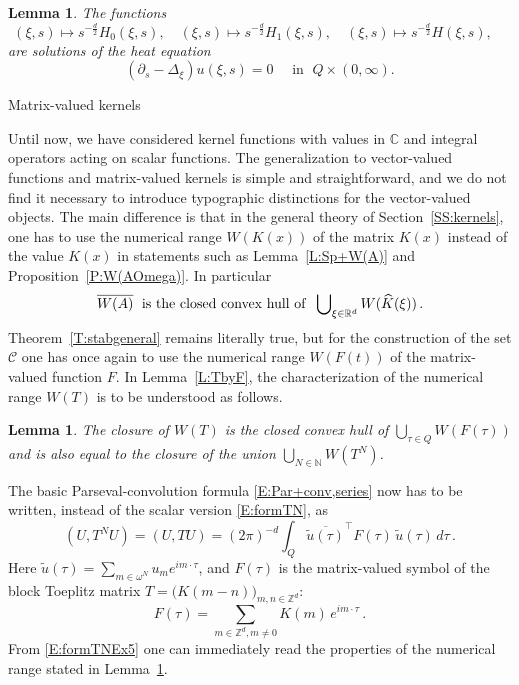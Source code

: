 \documentclass[12pt]{amsart}
\makeatletter
\def\subsection{\@startsection{section}{1}%
  \z@{1.2\linespacing\@plus\linespacing}{.5\linespacing}%
  {\normalfont\scshape\centering}}
\def\subsection{\@startsection{subsection}{2}%
  \z@{0.9\linespacing\@plus.7\linespacing}{-.5em}%
  {\normalfont\bfseries}}
\newtheorem{lemma}[theorem]{Lemma}
\theoremstyle{definition}
\theoremstyle{remark}
\numberwithin{equation}{section}
\newcommand\C{{\mathbb C}}
\newcommand\R{{\mathbb R}}
\newcommand\N{{\mathbb N}}
\newcommand\Z{{\mathbb Z}}
\newcommand\cC{{\mathcal{C}}}
\let\hat=\widehat
\makeatother
\begin{document}
\begin{lemma}
The functions
 \label{L:heat}
$$
 (\xi,s)\mapsto s^{-\frac d2}H_{0}(\xi,s),\quad
 (\xi,s)\mapsto s^{-\frac d2}H_{1}(\xi,s),\quad
 (\xi,s)\mapsto s^{-\frac d2}H(\xi,s),\quad
$$
are solutions of the heat equation 
$$
(\partial_{s}-\Delta_{\xi})u(\xi,s)=0\quad\mbox{ in }\; Q\times(0,\infty).
$$
\end{lemma}


\subsection{Matrix-valued kernels}\label{SS:matrix}\ 

Until now, we have considered kernel functions with values in $\C$ and integral operators acting on scalar functions. The generalization to vector-valued functions and matrix-valued kernels is simple and straightforward, and we do not find it necessary to introduce typographic distinctions for the vector-valued objects. The main difference is that in the general theory of Section~\ref{SS:kernels}, one has to use the numerical range $W(K(x))$ of the matrix $K(x)$ instead of the value $K(x)$ in statements such as Lemma~\ref{L:Sp+W(A)} and Proposition~\ref{P:W(AOmega)}. In particular
\begin{equation}
\label{E:NumranGen}
\mbox{$\overline{W(A)}$\; is the closed convex hull of }\;
\bigcup\nolimits_{\xi \in\R^{d}}W(\hat K(\xi))\,.
\end{equation}
Theorem~\ref{T:stabgeneral} remains literally true, but for the construction of the set $\cC$ one has once again to use the numerical range $W(F(t))$ of the matrix-valued function $F$. 
In Lemma~\ref{L:TbyF}, the characterization of the numerical range $W(T)$ is to be understood as follows.
\begin{lemma}
\label{L:TbyFEx5}
 The closure of $W(T)$ is the closed convex hull of $\bigcup_{\tau\in Q}W(F(\tau))$ and is also equal to the closure of the union 
 $\bigcup_{N\in\N}W(T^{N})$.
\end{lemma}
 
The basic Parseval-convolution formula \eqref{E:Par+conv,series} now has to be written, instead of the scalar version \eqref{E:formTN}, as
\begin{equation}
\label{E:formTNEx5}
 (U,T^{N}U) = (U,TU) = (2\pi)^{-d}\int_{Q} \overline{\tilde u(\tau)}^{\top} F(\tau)\,\tilde u(\tau)\,d\tau\,.
\end{equation}
Here $\tilde u(\tau)=\sum_{m\in\omega^{N}}u_{m}e^{im\cdot \tau}$, and $F(\tau)$ is the matrix-valued symbol of the block Toeplitz matrix 
$T=\big(K(m-n)\big)_{m,n\in\Z^{d}}$:
\begin{equation}
\label{E:F(t)Ex5}
 F(\tau) = \sum_{m\in\Z^{d},m\ne0}K(m)\,e^{im\cdot \tau}\,.
\end{equation}
From \eqref{E:formTNEx5} one can immediately read the properties of the numerical range stated in Lemma~\ref{L:TbyFEx5}.
\end{document}
